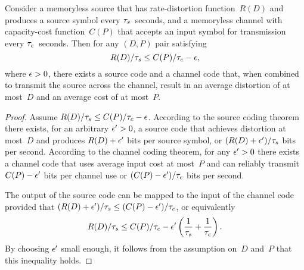 \begin{subappendices}
\begin{theorem}
  \label{thm:separationforward}
  Consider a memoryless source that has rate-distortion function~$R(D)$ and 
  produces a source symbol every ${\tau_s}$~seconds, and a memoryless channel with
  capacity-cost function~$C(P)$ that accepts an input symbol for transmission
  every ${\tau_c}$~seconds. Then for any $(D,P)$ pair satisfying
  \begin{equation}
    \label{eq:separationforward}
    R(D)/{\tau_s} \le C(P)/{\tau_c} - \epsilon,
  \end{equation}
  where $\epsilon > 0$, there exists a source code and a channel code that, when
  combined to transmit the source across the channel, result in an average
  distortion of at most~$D$ and an average cost of at most~$P$.
\end{theorem}

\begin{proof}
  Assume $R(D)/{\tau_s} \le C(P)/{\tau_c} - \epsilon$. According to the source coding theorem
  there exists, for an arbitrary $\epsilon' > 0$, a source code that achieves
  distortion at most~$D$ and produces $R(D) + \epsilon'$ bits per source symbol, or
  $(R(D) + \epsilon')/{\tau_s}$ bits per second. According to the channel coding theorem,
  for any $\epsilon' > 0$ there exists a channel code that uses average input
  cost at most~$P$ and can reliably transmit $C(P) - \epsilon'$ bits per channel use
  or $(C(P) - \epsilon')/{\tau_c}$ bits per second.

  The output of the source code can be mapped to the input of the channel code
  provided that $(R(D) + \epsilon')/{\tau_s} \le (C(P) - \epsilon')/{\tau_c}$, 
  or equivalently
  \[ R(D)/{\tau_s} \le C(P)/{\tau_c} - \epsilon'\left(\frac{1}{{\tau_s}} + \frac{1}{{\tau_c}} \right). \]
  By choosing $\epsilon'$ small enough, it follows from the assumption on~$D$ and~$P$
  that this inequality holds.
\end{proof}


\end{subappendices}

